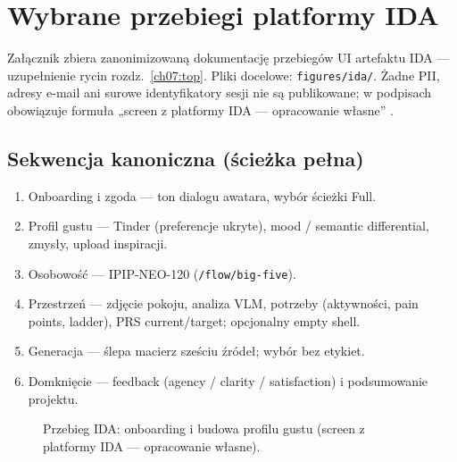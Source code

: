 \chapter{Wybrane przebiegi platformy IDA}
\label{app:h:top}

Załącznik zbiera zanonimizowaną dokumentację przebiegów UI artefaktu IDA --- uzupełnienie rycin rozdz.~\ref{ch07:top}. Pliki docelowe: \texttt{figures/ida/}. Żadne PII, adresy e-mail ani surowe identyfikatory sesji nie są publikowane; w podpisach obowiązuje formuła „screen z platformy IDA --- opracowanie własne” \parencite{idaPlatform2026}.

\section{Sekwencja kanoniczna (ścieżka pełna)}
\label{app:h:sec:full}

\begin{enumerate}
  \item Onboarding i zgoda --- ton dialogu awatara, wybór ścieżki Full.
  \item Profil gustu --- Tinder (preferencje ukryte), mood / semantic differential, zmysły, upload inspiracji.
  \item Osobowość --- IPIP-NEO-120 (\texttt{/flow/big-five}).
  \item Przestrzeń --- zdjęcie pokoju, analiza VLM, potrzeby (aktywności, pain points, ladder), PRS current/target; opcjonalny empty shell.
  \item Generacja --- ślepa macierz sześciu źródeł; wybór bez etykiet.
  \item Domknięcie --- feedback (agency / clarity / satisfaction) i podsumowanie projektu.
\end{enumerate}

\begin{figure}[htbp]
  \centering
  \caption{Przebieg IDA: onboarding i budowa profilu gustu (screen z platformy IDA --- opracowanie własne).}
  \label{fig:app:h:onboarding}
\end{figure}


